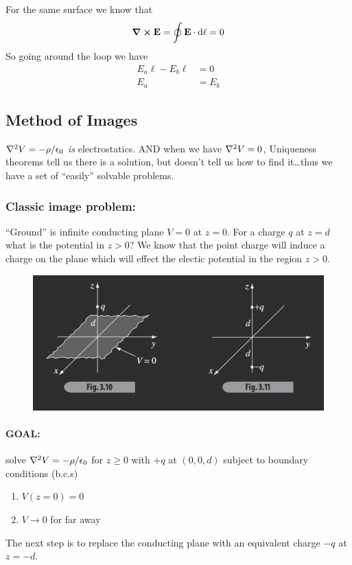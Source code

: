 \documentclass[../main.tex]{subfiles}
\begin{document}
For the same surface we know that
\begin{align*}
    \curl \vb E = \oint \vb E \cdot \dd\ell = 0
\end{align*}
So going around the loop we have
\begin{align*}
    E_a \ell - E_b \ell &= 0 \\
    E_a &= E_b
\end{align*}

\newpage
\subsection{Method of Images}

$\laplacian V = -\rho/\epsilon_0$ \textit{is} electrostatics. AND when we have $\laplacian V = 0$, Uniqueness theorems tell us there is a solution,
but doesn't tell us how to find it\dots thus we have a set of ``easily'' solvable problems.

\subsubsection{Classic image problem:}

``Ground'' is infinite conducting plane $V = 0$ at $z = 0$. For a charge $q$ at $z = d$ what is the potential in $z > 0$?
We know that the point charge will induce a charge on the plane which will effect the electic potential in the region $z > 0$.
\begin{figure}[ht]
    \centering
    \includegraphics[width=0.5\linewidth]{fig3_10.png}
    \caption{}
    \label{fig:lecture3_10}
\end{figure}

\paragraph{GOAL: } solve $\laplacian V = -\rho/\epsilon_0$ for $z \geq 0$ 
with $+q$ at $(0,0,d)$ subject to boundary conditions (b.c.s)
\begin{enumerate}
    \item $V(z=0) = 0$ 
    \item $V \to 0$ for far away
\end{enumerate}
The next step is to replace the conducting plane with an equivalent charge $-q$ at $z = -d$.
\end{document}
